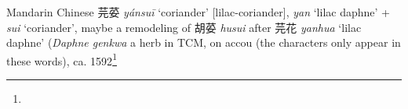 \begin{etymology}\label{ety:yansui}
Mandarin Chinese {芫荽} \textit{yánsuī} `coriander' [lilac-coriander], \textit{yan} `lilac daphne' + \textit{sui} `coriander', maybe a remodeling of 胡荽 \textit{husui} after 芫花 \textit{yanhua} `lilac daphne' (\textit{Daphne genkwa} a herb in TCM, on accou (the characters only appear in these words), ca. 1592\footnote{}
\end{etymology}